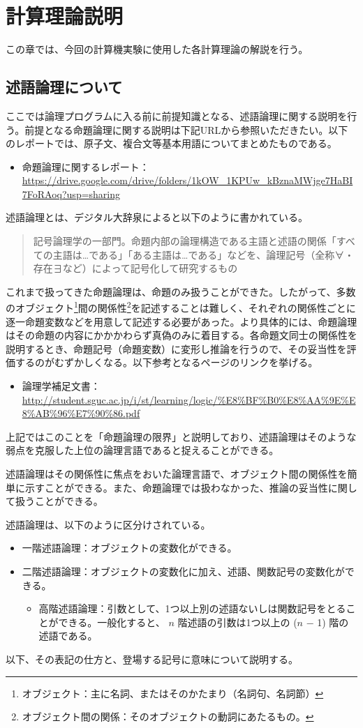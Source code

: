 \documentclass[dvipdfmx]{jsarticle}
\begin{document}
\section{計算理論説明}
この章では、今回の計算機実験に使用した各計算理論の解説を行う。
\subsection{述語論理について}
ここでは論理プログラムに入る前に前提知識となる、述語論理に関する説明を行う。前提となる命題論理に関する説明は下記URLから参照いただきたい。以下のレポートでは、原子文、複合文等基本用語についてまとめたものである。\par
\begin{itemize}
  \item 命題論理に関するレポート：\url{https://drive.google.com/drive/folders/1kOW_1KPUw_kBznaMWjge7HaBI7FoRAoq?usp=sharing}
\end{itemize}
述語論理とは、デジタル大辞泉によると以下のように書かれている。
\begin{quote}
  記号論理学の一部門。命題内部の論理構造である主語と述語の関係「すべての主語は…である」「ある主語は…である」などを、論理記号（全称∀・存在∃など）によって記号化して研究するもの
\end{quote}
これまで扱ってきた命題論理は、命題のみ扱うことができた。したがって、多数のオブジェクト\footnote{オブジェクト：主に名詞、またはそのかたまり（名詞句、名詞節）}間の関係性\footnote{オブジェクト間の関係：そのオブジェクトの動詞にあたるもの。}を記述することは難しく、それぞれの関係性ごとに逐一命題変数などを用意して記述する必要があった。より具体的には、命題論理はその命題の内容にかかかわらず真偽のみに着目する。各命題文同士の関係性を説明するとき、命題記号（命題変数）に変形し推論を行うので、その妥当性を評価するのがむずかしくなる。以下参考となるページのリンクを挙げる。
\begin{itemize}
  \item 論理学補足文書：\url{http://student.sguc.ac.jp/i/st/learning/logic/%E8%BF%B0%E8%AA%9E%E8%AB%96%E7%90%86.pdf}
\end{itemize}
上記ではこのことを「命題論理の限界」と説明しており、述語論理はそのような弱点を克服した上位の論理言語であると捉えることができる。\par
述語論理はその関係性に焦点をおいた論理言語で、オブジェクト間の関係性を簡単に示すことができる。また、命題論理では扱わなかった、推論の妥当性に関して扱うことができる。\par
述語論理は、以下のように区分けされている。
\begin{itemize}
  \item 一階述語論理：オブジェクトの変数化ができる。
  \item 二階述語論理：オブジェクトの変数化に加え、述語、関数記号の変数化ができる。
  \begin{itemize}
    \item 高階述語論理：引数として、1つ以上別の述語ないしは関数記号をとることができる。一般化すると、 $n$ 階述語の引数は1つ以上の ($n$ − 1) 階の述語である。
  \end{itemize}
\end{itemize}
以下、その表記の仕方と、登場する記号に意味について説明する。
\end{document}
